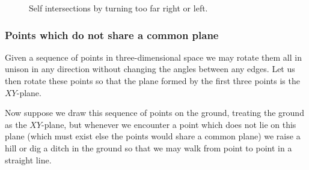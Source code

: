 \documentclass{article}
\begin{document}
\begin{figure}[htbp]
\begin{subfigure}{0.5\textwidth}
	\end{subfigure}%
	\caption{Self intersections by turning too far right or left.}
	\label{self-intersections}
\end{figure}

\subsubsection{Points which do not share a common plane}

Given a sequence of points in three-dimensional space we may rotate them all in unison in any direction without changing the angles between any edges. Let us then rotate these points so that the plane formed by the first three points is the \(XY\)-plane.

Now suppose we draw this sequence of points on the ground, treating the ground as the \(XY\)-plane, but whenever we encounter a point which does not lie on this plane (which must exist else the points would share a common plane) we raise a hill or dig a ditch in the ground so that we may walk from point to point in a straight line.
\end{document}
